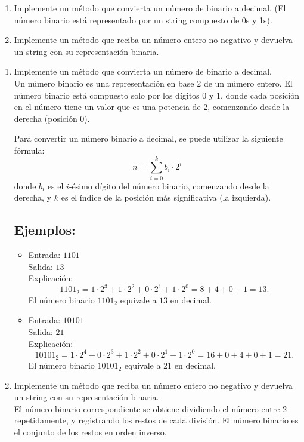 \begin{enumerate}[label=\alph*)]
    \item Implemente un método que convierta un número de binario a decimal. (El número binario está representado por un string compuesto de 0s y 1s).
    \item Implemente un método que reciba un número entero no negativo y devuelva un string con su representación binaria.
\end{enumerate}

\begin{enumerate}[label=\alph*)]
    \item Implemente un método que convierta un número de binario a decimal.\\
    Un número binario es una representación en base 2 de un número entero. El número binario está compuesto solo por los dígitos \(0\) y \(1\), donde cada posición en el número tiene un valor que es una potencia de 2, comenzando desde la derecha (posición 0).

    Para convertir un número binario a decimal, se puede utilizar la siguiente fórmula:
    \[
    n = \sum_{i=0}^{k} b_i \cdot 2^i
    \]
    donde \(b_i\) es el \(i\)-ésimo dígito del número binario, comenzando desde la derecha, y \(k\) es el índice de la posición más significativa (la izquierda).

    \subsection*{Ejemplos:}
    \begin{itemize}
        \item Entrada: \( \text{1101} \) \\
        Salida: \( 13 \) \\
        Explicación:
        \[
        1101_2 = 1 \cdot 2^3 + 1 \cdot 2^2 + 0 \cdot 2^1 + 1 \cdot 2^0 = 8 + 4 + 0 + 1 = 13.
        \]
        El número binario \(1101_2\) equivale a \(13\) en decimal.

        \item Entrada: \( \text{10101} \) \\
        Salida: \( 21 \) \\
        Explicación:
        \[
        10101_2 = 1 \cdot 2^4 + 0 \cdot 2^3 + 1 \cdot 2^2 + 0 \cdot 2^1 + 1 \cdot 2^0 = 16 + 0 + 4 + 0 + 1 = 21.
        \]
        El número binario \(10101_2\) equivale a \(21\) en decimal.
    \end{itemize}

    \item Implemente un método que reciba un número entero no negativo y devuelva un string con su representación binaria.\\
    El número binario correspondiente se obtiene dividiendo el número entre 2 repetidamente, y registrando los restos de cada división. El número binario es el conjunto de los restos en orden inverso.


\end{enumerate}
